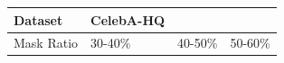 \begin{tabular}{llll}
\toprule
Dataset & CelebA-HQ &  &  \\
\midrule
Mask Ratio & 30-40\% & 40-50\% & 50-60\% \\
\bottomrule
\end{tabular}
